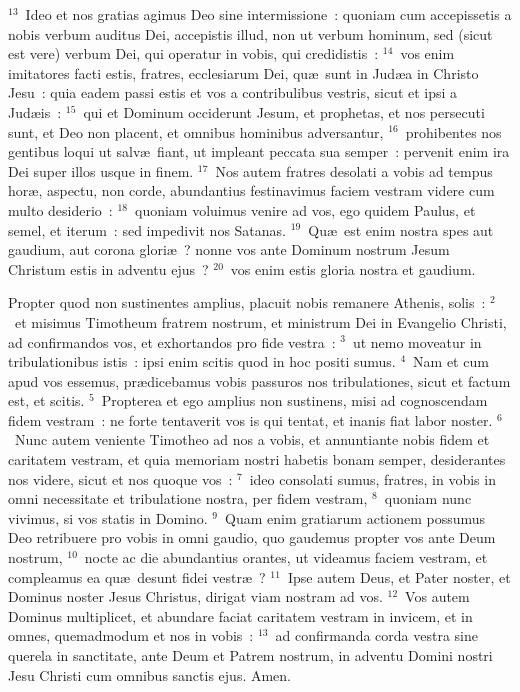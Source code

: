 ${}^{13}$~Ideo et nos gratias agimus Deo sine intermissione~: quoniam cum accepissetis a nobis verbum auditus Dei, accepistis illud, non ut verbum hominum, sed (sicut est vere) verbum Dei, qui operatur in vobis, qui credidistis~:
${}^{14}$~vos enim imitatores facti estis, fratres, ecclesiarum Dei, qu\ae\ sunt in Jud\ae a in Christo Jesu~: quia eadem passi estis et vos a contribulibus vestris, sicut et ipsi a Jud\ae is~:
${}^{15}$~qui et Dominum occiderunt Jesum, et prophetas, et nos persecuti sunt, et Deo non placent, et omnibus hominibus adversantur,
${}^{16}$~prohibentes nos gentibus loqui ut salv\ae\ fiant, ut impleant peccata sua semper~: pervenit enim ira Dei super illos usque in finem.
${}^{17}$~Nos autem fratres desolati a vobis ad tempus hor\ae , aspectu, non corde, abundantius festinavimus faciem vestram videre cum multo desiderio~:
${}^{18}$~quoniam voluimus venire ad vos, ego quidem Paulus, et semel, et iterum~: sed impedivit nos Satanas.
${}^{19}$~Qu\ae\ est enim nostra spes aut gaudium, aut corona glori\ae~? nonne vos ante Dominum nostrum Jesum Christum estis in adventu ejus~?
${}^{20}$~vos enim estis gloria nostra et gaudium.

\bchapter
\lettrine[lines=3,image=true,loversize=0.05,lraise=-0.03]{P}{}ropter quod non sustinentes amplius, placuit nobis remanere Athenis, solis~:
${}^{2}$~et misimus Timotheum fratrem nostrum, et ministrum Dei in Evangelio Christi, ad confirmandos vos, et exhortandos pro fide vestra~:
${}^{3}$~ut nemo moveatur in tribulationibus istis~: ipsi enim scitis quod in hoc positi sumus.
${}^{4}$~Nam et cum apud vos essemus, pr\ae dicebamus vobis passuros nos tribulationes, sicut et factum est, et scitis.
${}^{5}$~Propterea et ego amplius non sustinens, misi ad cognoscendam fidem vestram~: ne forte tentaverit vos is qui tentat, et inanis fiat labor noster.
${}^{6}$~Nunc autem veniente Timotheo ad nos a vobis, et annuntiante nobis fidem et caritatem vestram, et quia memoriam nostri habetis bonam semper, desiderantes nos videre, sicut et nos quoque vos~:
${}^{7}$~ideo consolati sumus, fratres, in vobis in omni necessitate et tribulatione nostra, per fidem vestram,
${}^{8}$~quoniam nunc vivimus, si vos statis in Domino.
${}^{9}$~Quam enim gratiarum actionem possumus Deo retribuere pro vobis in omni gaudio, quo gaudemus propter vos ante Deum nostrum,
${}^{10}$~nocte ac die abundantius orantes, ut videamus faciem vestram, et compleamus ea qu\ae\ desunt fidei vestr\ae~?
${}^{11}$~Ipse autem Deus, et Pater noster, et Dominus noster Jesus Christus, dirigat viam nostram ad vos.
${}^{12}$~Vos autem Dominus multiplicet, et abundare faciat caritatem vestram in invicem, et in omnes, quemadmodum et nos in vobis~:
${}^{13}$~ad confirmanda corda vestra sine querela in sanctitate, ante Deum et Patrem nostrum, in adventu Domini nostri Jesu Christi cum omnibus sanctis ejus. Amen.

